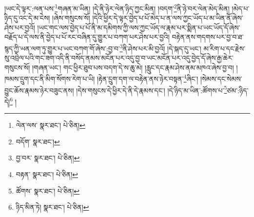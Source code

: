 །ཡང་དེ་ལྟར་:ལན་པས་\footnote{ལེན་ལས་  སྣར་ཐང་།  པེ་ཅིན། }གཞན་མ་ཡིན། །དེ་ནི་ཉེར་ལེན་ཉིད་ཀྱང་མིན། །བདག་\footnote{བདོག་  སྣར་ཐང་། }ནི་ཉེ་བར་ལེན་མེད་མིན། །མེད་པ་ཉིད་དུ་འང་དེ་མ་ངེས། །ཞེས་གསུངས་སོ། །དེའི་ཕྱིར་དེ་ལྟར་བྱེད་པ་པོ་མེད་པ་ན་ལས་ཀྱང་ཡོད་པ་མ་ཡིན་ནོ་ཞེས་ཤེས་པར་བྱའོ། །ཡང་གང་ལས་བྱེད་པ་པོ་ནི་མ་དམིགས་ཀྱི་ལས་ཀྱང་ཡོད་ལ་རྣམ་པར་སྨིན་པ་ཡང་ཡོད་དོ་ཞེས་བརྗོད་པ་དེ་ལས་ནི་བྱེད་པ་པོ་རང་བཞིན་དུ་གྱུར་པ་བཀག་པར་ཤེས་པར་བྱའི། བརྟེན་ནས་གདགས་པར་བྱ་བ་ཐ་སྙད་ཀྱི་ཡན་ལག་ཏུ་གྱུར་པ་ཡང་བཀག་གོ་ཞེས་:བྱ་བ་\footnote{བྱ་བར་  སྣར་ཐང་།  པེ་ཅིན། }ནི་ཤེས་པར་མི་བྱའོ། །དེ་སྐད་དུ་ཡང་། མ་རིག་པ་དང་རྗེས་སུ་འབྲེལ་པའི་གང་ཟག་འདི་ནི་བསོད་ནམས་མངོན་པར་འདུ་བྱ་བ་ཡང་མངོན་པར་འདུ་བྱེད་དོ་ཞེས་རྒྱ་ཆེར་གསུངས་སོ། །གཞན་ཡང་། གང་ཕྱིར་ཐུབ་པས་བདག་དེ་ས་ཆུ་མེ། །རླུང་དང་རྣམ་ཤེས་ནམ་མཁའ་ཞེས་བྱ་བ། །ཁམས་དྲུག་དང་ནི་མིག་སོགས་རེག་པ་ཡི། །རྟེན་དྲུག་དག་ལ་བརྟེན་ནས་ཉེར་བསྟན་\footnote{བརྟན་  སྣར་ཐང་།  པེ་ཅིན། }ཞིང་། །སེམས་དང་སེམས་བྱུང་ཆོས་རྣམས་ཉེར་བཟུང་ནས། །དེས་གསུངས་དེ་ཕྱིར་དེ་ནི་དེ་རྣམས་དང་། །དེ་ཉིད་མ་ཡིན་:ཚོགས་པ་\footnote{ཚོགས་  སྣར་ཐང་།  པེ་ཅིན། }ཙམ་:ཉིད་དེ།\footnote{ཉིད་མིན་ཏེ།  སྣར་ཐང་།  པེ་ཅིན། } །
